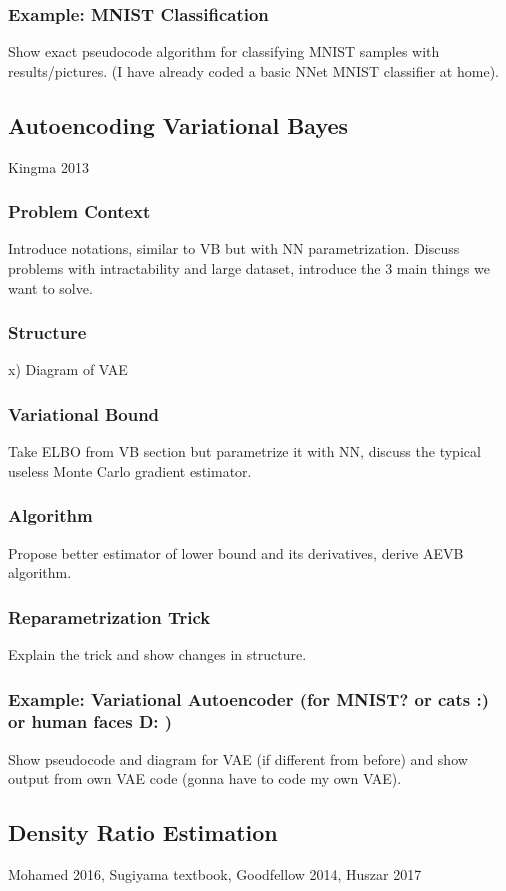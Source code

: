 \documentclass[a4paper,12pt]{article}
\begin{document}
\subsubsection{Example: MNIST Classification}
Show exact pseudocode algorithm for classifying MNIST samples with results/pictures. (I have already coded a basic NNet MNIST classifier at home).
\newpage
\subsection{Autoencoding Variational Bayes}
Kingma 2013
\subsubsection{Problem Context}
Introduce notations, similar to VB but with NN parametrization. Discuss problems with intractability and large dataset, introduce the 3 main things we want to solve.
\subsubsection{Structure}x)
Diagram of VAE
\subsubsection{Variational Bound}
Take ELBO from VB section but parametrize it with NN, discuss the typical useless Monte Carlo gradient estimator.
\subsubsection{Algorithm}
Propose better estimator of lower bound and its derivatives, derive AEVB algorithm.
\subsubsection{Reparametrization Trick}
Explain the trick and show changes in structure.
\subsubsection{Example: Variational Autoencoder (for MNIST? or cats :) or human faces D: )}
Show pseudocode and diagram for VAE (if different from before) and show output from own VAE code (gonna have to code my own VAE).
\newpage
\subsection{Density Ratio Estimation}
Mohamed 2016, Sugiyama textbook, Goodfellow 2014, Huszar 2017
\end{document}
